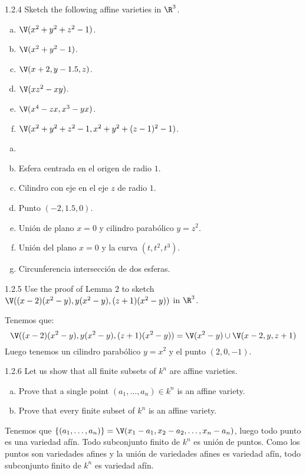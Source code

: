 \documentclass[twoside]{article}
\begin{document}
\newpage

\begin{ejercicio}{1.2.4}
Sketch the following affine varieties in $\R^3$.
\begin{enumerate}[a.]
\item $\V(x^2+y^2+z^2-1)$.
\item $\V(x^2+y^2-1)$.
\item $\V(x+2,y-1.5,z)$.
\item $\V(xz^2-xy)$.
\item $\V(x^4-zx,x^3-yx)$.
\item $\V(x^2+y^2+z^2-1, x^2+y^2+(z-1)^2-1)$.
\end{enumerate}
\end{ejercicio}
\begin{solucion}
\begin{enumerate}[a.]
\item[]
\item Esfera centrada en el origen de radio $1$.
\item Cilindro con eje en el eje $z$ de radio $1$.
\item Punto $(-2,1.5,0)$.
\item Unión de plano $x=0$ y cilindro parabólico $y=z^2$.
\item Unión del plano $x=0$ y la curva $(t,t^2,t^3)$.
\item Circunferencia intersección de dos esferas.
\end{enumerate}
\end{solucion}

\newpage


\begin{ejercicio}{1.2.5}
Use the proof of Lemma 2 to sketch $\V((x-2)(x^2-y),y(x^2-y),(z+1)(x^2-y))$ in $\R^3$.
\end{ejercicio}
\begin{solucion}
Tenemos que:
\[ \V((x-2)(x^2-y),y(x^2-y),(z+1)(x^2-y)) = \V(x^2-y) \cup \V(x-2,y,z+1) \]
Luego tenemos un cilindro parabólico $y=x^2$ y el punto $(2,0,-1)$.
\end{solucion}

\newpage

\begin{ejercicio}{1.2.6}
Let us show that all finite subsets of $k^n$ are affine varieties.
\begin{enumerate}[a.]
\item Prove that a single point $(a_1,\dots,a_n) \in k^n$ is an affine variety.
\item Prove that every finite subset of $k^n$ is an affine variety.
\end{enumerate}
\end{ejercicio}
\begin{solucion}
Tenemos que $\{(a_1,\dots,a_n)\} = \V(x_1-a_1,x_2-a_2,\dots,x_n-a_n)$, luego todo punto es una variedad afín.
Todo subconjunto finito de $k^n$ es unión de puntos.
Como los puntos son variedades afines y la unión de variedades afines es variedad afín, todo subconjunto finito de $k^n$ es variedad afín.
\end{solucion}
\end{document}
